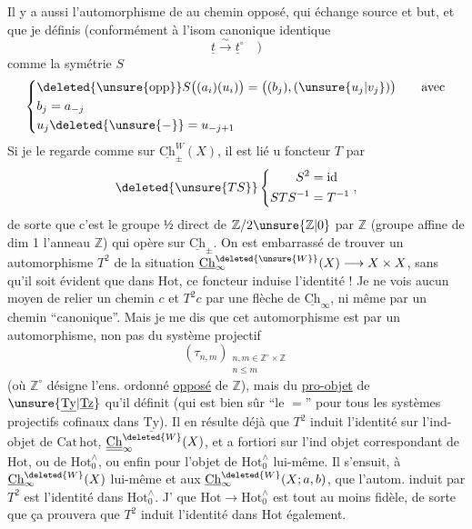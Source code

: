 Il y a aussi l'automorphisme  de  
au chemin opposé, qui échange source et but,
et que je définis (conformément à l'isom
canonique identique
\[
\underline t\xrightarrow{\sim}\underline t^{\circ}\quad)
\]
comme la symétrie $S$
\[
\left\{\begin{aligned}
&\deleted{\unsure{\mathrm{opp}}}S\bigl((a_i)(u_i)\bigr)=\bigl((b_j),(\unsure{u_j|v_j})\bigr)\qquad\text{avec}\\
&b_j=a_{-j}\\
&u_j\deleted{\unsure{-}}=u_{-j+1}
\end{aligned}\right.
\]
Si je le regarde comme  sur $\underline{\mathrm{Ch}}_{\pm}^{W}(X)$,
il est lié u foncteur $T$ par
\[
\deleted{\unsure{TS}}\left\{\begin{aligned}S^2&=\mathrm{id}\\STS^{-1}&=T^{-1}\end{aligned}\right.,
\]
de sorte que c'est le groupe $\text{½}$ direct de
$\mathbb Z/2\unsure{\mathbb Z|0}$ par $\mathbb Z$ (groupe affine de dim 1 
l'anneau $\mathbb Z$) qui opère sur $\underline{\mathrm{Ch}}_{\pm}$.
On est embarrassé de trouver un automorphisme
$T^2$ de la situation $\underline{\mathrm{Ch}}^{\deleted{\unsure{W}}}_{\infty}(X)\longrightarrow X\times X$, sans qu'il
soit évident que dans $\mathrm{Hot}$, ce foncteur
induise l'identité ! Je ne vois aucun moyen
de relier un chemin $c$ et $T^2c$
par une flèche de $\underline{\mathrm{Ch}}_{\infty}$, ni même par
un chemin ``canonique''. Mais je me dis
que cet automorphisme est   par un automorphisme,
 non pas du système projectif
\[
(\tau_{n,m})_{\substack{n,m\in\mathbb Z^{\circ}\times\mathbb Z\\n\leq m}}
\]
(où  $\mathbb Z^{\circ}$ désigne l'ens. ordonné
\uline{opposé} de $\mathbb Z$), mais du \uline{pro-objet} de
$\unsure{\underline{\mathrm{Ty}}|\underline{\mathrm{Tz}}}$ qu'il définit (qui est bien sûr ``le $=$''
pour tous les systèmes projectifs cofinaux  dans
$\underline{\mathrm{Ty}}$). Il en résulte déjà que $T^2$
induit l'identité sur l'ind-objet
de $\mathrm{Cat}\,\mathrm{hot}$, $\underline{\underline{\mathrm{Ch}}}_{\infty}^{\deleted{W}}(X)$, et a fortiori sur
l'ind objet correspondant de $\mathrm{Hot}$, ou de
$\mathrm{Hot}_0^{\wedge}$, ou enfin pour l'objet de $\mathrm{Hot}_0^{\wedge}$ lui-même.
 Il s'ensuit,  à $\underline{\mathrm{Ch}}^{\deleted{W}}_{\infty}(X)$
lui-même et aux $\underline{\mathrm{Ch}}^{\deleted{W}}_{\infty}(X;a,b)$, que
l'autom. induit par $T^2$ est l'identité dans
$\mathrm{Hot}_0^{\wedge}$. J' que $\mathrm{Hot}\longrightarrow\mathrm{Hot}_0^{\wedge}$ est
tout au moins fidèle, de sorte que ça prouvera
que $T^2$ induit l'identité dans $\mathrm{Hot}$ également.

